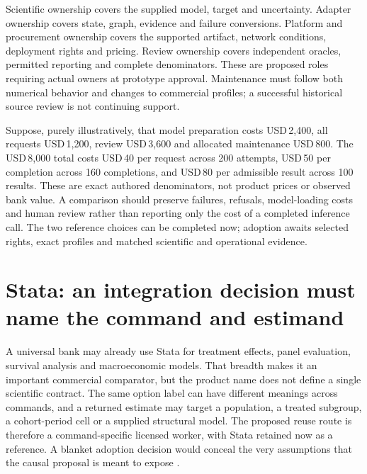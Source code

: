 Scientific ownership covers the supplied model, target and uncertainty.
Adapter ownership covers state, graph, evidence and failure conversions.
Platform and procurement ownership covers the supported artifact, network
conditions, deployment rights and pricing. Review ownership covers
independent oracles, permitted reporting and complete denominators. These
are proposed roles requiring actual owners at prototype approval.
Maintenance must follow both numerical behavior and changes to commercial
profiles; a successful historical source review is not continuing support.
\citep{exec25_bn_commercial_choice}

Suppose, purely illustratively, that model preparation costs USD\,2,400,
all requests USD\,1,200, review USD\,3,600 and allocated maintenance
USD\,800. The USD\,8,000 total costs USD\,40 per request across 200
attempts, USD\,50 per completion across 160 completions, and USD\,80
per admissible result across 100 results. These are exact authored
denominators, not product prices or observed bank value. A comparison
should preserve failures, refusals, model-loading costs and human review
rather than reporting only the cost of a completed inference call. The
two reference choices can be completed now; adoption awaits selected
rights, exact profiles and matched scientific and operational evidence.
\citep{exec25_bn_commercial_choice}
\label{sec:exec25-bn-commercial-reuse-end}


\section{Stata: an integration decision must name the command and estimand}
\label{sec:exec24-stata-reuse}

A universal bank may already use Stata for treatment effects, panel
evaluation, survival analysis and macroeconomic models. That breadth makes
it an important commercial comparator, but the product name does not define
a single scientific contract. The same option label can have different
meanings across commands, and a returned estimate may target a population,
a treated subgroup, a cohort-period cell or a supplied structural model.
The proposed reuse route is therefore a command-specific licensed worker,
with Stata retained now as a reference. A blanket adoption decision would
conceal the very assumptions that the causal proposal is meant to expose
\cite{exec13_ci_stata_causal_intro,exec18_gp_stata_xthdid,
exec22_state_stata_sspace_post,exec24_stata_choice}.

